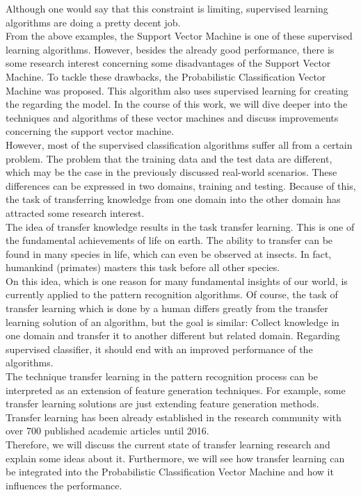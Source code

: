Although one would say that this constraint is limiting, supervised learning algorithms are doing a pretty decent job.\\
From the above examples, the Support Vector Machine is one of these supervised learning algorithms. 
However, besides the already good performance, there is some research interest concerning some disadvantages of the Support Vector Machine.
To tackle these drawbacks, the Probabilistic Classification Vector Machine was proposed.
This algorithm also uses supervised learning for creating the regarding the model.
In the course of this work, we will dive deeper into the techniques and algorithms of these vector machines and discuss improvements concerning the support vector machine.\\
However, most of the supervised classification algorithms suffer all from a certain problem. 
The problem that the training data and the test data are different, which may be the case in the previously discussed real-world scenarios.
These differences can be expressed in two domains, training and testing.
Because of this, the task of transferring knowledge from one domain into the other domain has attracted some research interest.\\
The idea of transfer knowledge results in the task transfer learning. 
This is one of the fundamental achievements of life on earth.
The ability to transfer can be found in many species in life, which can even be observed at insects.
In fact, humankind (primates) masters this task before all other species.\\
On this idea, which is one reason for many fundamental insights of our world, is currently applied to the pattern recognition algorithms. 
Of course, the task of transfer learning which is done by a human differs greatly from the transfer learning solution of an algorithm, but the goal is similar:
Collect knowledge in one domain and transfer it to another different but related domain. Regarding supervised classifier, it should end with an improved performance of the algorithms.\\
The technique transfer learning in the pattern recognition process can be interpreted as an extension of feature generation techniques.
For example, some transfer learning solutions are just extending feature generation methods. 
Transfer learning has been already established in the research community with over 700 published academic articles until 2016.\\
Therefore, we will discuss the current state of transfer learning research and explain some ideas about it.
Furthermore, we will see how transfer learning can be integrated into the Probabilistic Classification Vector Machine and how it influences the performance.\\
\cite{Paluszek.2017}\cite{Wu.2008}\cite{Singh.2010}\cite{TrevorHastie.2009}\cite{Theodoridis.2015}\cite{Buchholtz.1982} \cite{Theodoridis.2008} \cite{Weiss.2016}\cite{Bishop.2009}\cite{Tipping.2001}\cite{Chen.2009}\cite{Pan.2010}\cite{Weiss.2016}\cite{Theodoridis.2008}
